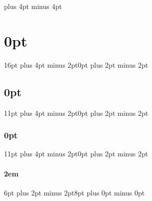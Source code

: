 \newskip\bigskipamount   \bigskipamount =20pt plus 4pt minus 4pt
\setlength{\parskip}{0.75em}
\setlength{\parindent}{2em}

\usepackage{titlesec}
\titlespacing\section{0pt}{16pt plus 4pt minus 2pt}{0pt plus 2pt minus 2pt}
\titlespacing\subsection{0pt}{11pt plus 4pt minus 2pt}{0pt plus 2pt minus 2pt}
\titlespacing\subsubsection{0pt}{11pt plus 4pt minus 2pt}{0pt plus 2pt minus 2pt}
\titlespacing\paragraph{2em}{6pt plus 2pt minus 2pt}{8pt plus 0pt minus 0pt}

